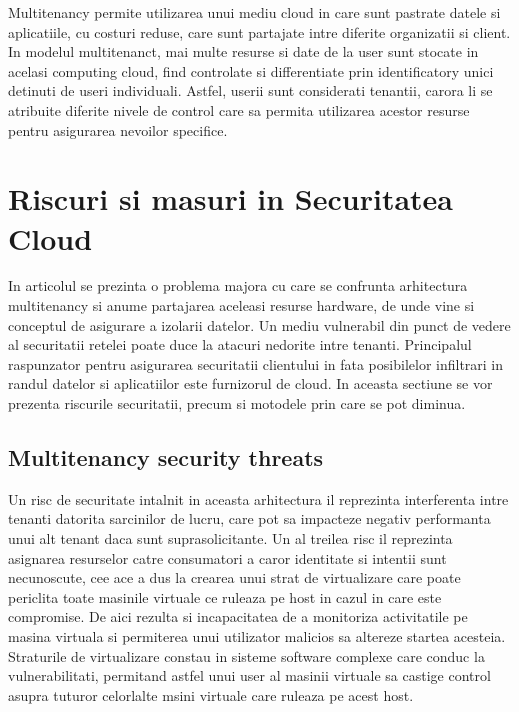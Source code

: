 \documentclass[twoside,twocolumn]{article}
\begin{document}
Multitenancy permite utilizarea unui mediu cloud in care sunt pastrate datele si aplicatiile, cu costuri reduse, care sunt partajate intre diferite organizatii si client.  In modelul multitenanct, mai multe resurse si date de la user sunt stocate in acelasi computing cloud, find controlate si differentiate prin identificatory unici detinuti de useri individuali. Astfel, userii sunt considerati tenantii, carora li se atribuite diferite nivele de control care sa permita utilizarea acestor resurse pentru asigurarea nevoilor specifice. \\



\section{Riscuri si masuri in Securitatea Cloud}

In articolul \cite{1} se prezinta o problema majora cu care se confrunta arhitectura multitenancy si anume partajarea aceleasi resurse hardware, de unde vine si conceptul de asigurare a izolarii datelor. Un mediu vulnerabil din punct de vedere al securitatii retelei poate duce la atacuri nedorite intre tenanti. Principalul raspunzator pentru asigurarea  securitatii clientului  in fata posibilelor infiltrari in randul datelor si aplicatiilor este furnizorul de cloud. In aceasta sectiune se vor prezenta riscurile securitatii, precum si motodele prin care se pot diminua.

\subsection{Multitenancy security threats}
Un risc de securitate intalnit in aceasta arhitectura il reprezinta interferenta intre tenanti datorita sarcinilor de lucru, care pot sa  impacteze negativ performanta unui alt tenant daca sunt suprasolicitante. Un al treilea risc il reprezinta  asignarea resurselor catre consumatori a caror identitate si intentii sunt necunoscute, cee ace a dus la crearea unui strat de virtualizare care poate periclita toate masinile virtuale ce ruleaza pe host in cazul in care este compromise. De aici rezulta si incapacitatea de a monitoriza activitatile pe masina virtuala si permiterea unui utilizator malicios sa altereze startea acesteia. Straturile de virtualizare constau in sisteme software complexe care conduc la vulnerabilitati, permitand astfel unui user al masinii virtuale sa castige control asupra tuturor celorlalte msini virtuale care ruleaza pe acest host.
\end{document}
